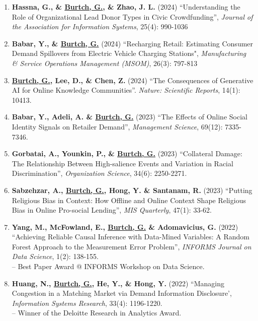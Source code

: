 \documentclass[10.5pt,letterpaper,sans]{moderncv}        %
\begin{document}
\begin{enumerate}[leftmargin=!,labelindent=5pt,itemindent=-15pt]
\item \textbf{Hassna, G., \& \underline{Burtch, G.}, \& Zhao, J. L.} (2024) ``Understanding the Role of Organizational Lead Donor Types in Civic Crowdfunding'', \textit{Journal of the Association for Information Systems}, 25(4): 990-1036

\item \textbf{Babar, Y., \& \underline{Burtch, G.}} (2024) ``Recharging Retail: Estimating Consumer Demand Spillovers from Electric Vehicle Charging Stations", \textit{Manufacturing \& Service Operations Management (MSOM)}, 26(3): 797-813

\item \textbf{\underline{Burtch, G.}, Lee, D., \& Chen, Z.} (2024) ``The Consequences of Generative AI for Online Knowledge Communities''. \textit{Nature: Scientific Reports}, 14(1): 10413.

\item \textbf{Babar, Y., Adeli, A. \& \underline{Burtch, G.}} (2023) ``The Effects of Online Social Identity Signals on Retailer Demand'', \textit{Management Science}, 69(12): 7335-7346.

\item \textbf{Gorbatai, A., Younkin, P., \& \underline{Burtch, G.}} (2023) ``Collateral Damage: The Relationship Between High-salience Events and Variation in Racial Discrimination'', \textit{Organization Science}, 34(6): 2250-2271.

\item \textbf{Sabzehzar, A., \underline{Burtch, G.}, Hong, Y. \& Santanam, R.} (2023) ``Putting Religious Bias in Context: How Offline and Online Context Shape Religious Bias in Online Pro-social Lending'', \textit{MIS Quarterly}, 47(1): 33-62.

\item \textbf{Yang, M., McFowland, E., \underline{Burtch, G.} \& Adomavicius, G.} (2022) ``Achieving Reliable Causal Inference with Data-Mined Variables: A Random Forest Approach to the Measurement Error Problem'', \textit{INFORMS Journal on Data Science}, 1(2): 138-155.  \\-- Best Paper Award @ INFORMS Workshop on Data Science.

\item \textbf{Huang, N., \underline{Burtch, G.}, He, Y., \& Hong, Y.} (2022) ``Managing Congestion in a Matching Market via Demand Information Disclosure', \textit{Information Systems Research}, 33(4): 1196-1220. \\-- Winner of the Deloitte Research in Analytics Award.


\end{enumerate}
\end{document}
